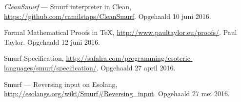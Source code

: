 \begin{thebibliography}{9}
	 \emph{CleanSmurf} --- Smurf interpreter in Clean,
	\url{https://github.com/camilstaps/CleanSmurf}. Opgehaald 10 juni 2016.

	 Formal Mathematical Proofs in \TeX{},
	\url{http://www.paultaylor.eu/proofs/}. Paul Taylor. Opgehaald 12 juni 2016.

	 Smurf Specification,
	\url{http://safalra.com/programming/esoteric-languages/smurf/specification/}.
	Opgehaald 27 april 2016.

	 Smurf --- Reversing input on Esolang,
	\url{http://esolangs.org/wiki/Smurf#Reversing_input}. Opgehaald 27 mei 2016.
\end{thebibliography}
